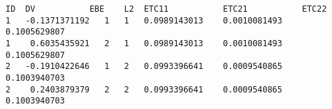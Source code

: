 \documentclass{article}
\begin{document}
\begin{verbatim}
ID	DV	         EBE	L2	ETC11	        ETC21	        ETC22
1	-0.1371371192	1	1	0.0989143013	0.0010081493	0.1005629807
1	 0.6035435921	2	1	0.0989143013	0.0010081493	0.1005629807
2	-0.1910422646	1	2	0.0993396641	0.0009540865	0.1003940703
2	 0.2403879379	2	2	0.0993396641	0.0009540865	0.1003940703
\end{verbatim}
\end{document}
